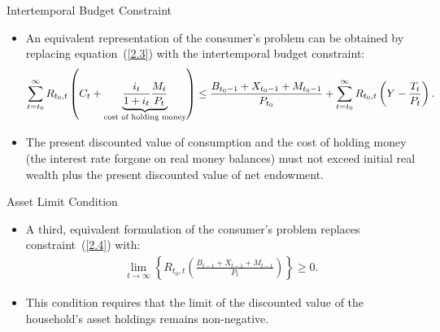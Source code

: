 \documentclass[11pt,aspectratio=169]{beamer}
\begin{document}
\begin{frame}{Intertemporal Budget Constraint}

\begin{itemize}
    \item An equivalent representation of the consumer’s problem can be obtained by replacing equation~(\ref{2.3}) with the intertemporal budget constraint:
\begin{align}
\sum_{t=t_0}^\infty R_{t_0,t}\left(
    C_t
    + 
    \underbrace{\frac{i_t}{1+i_t}\frac{M_t}{P_t}}_{\footnotesize\text{cost of holding money}}
\right)
\le 
\frac{B_{t_0-1}+X_{t_0-1}+M_{t_0-1}}{P_{t_0}}
+ 
\sum_{t=t_0}^\infty R_{t_0,t}\left(
    Y-\frac{T_t}{P_t}
\right).
\label{2.4}
\end{align}

\item The present discounted value of consumption and the cost of holding money (the interest rate forgone on real money balances) must not exceed initial real wealth plus the present discounted value of net endowment.
\end{itemize}
\end{frame}
\begin{frame}{Asset Limit Condition}

\begin{itemize}
    \item A third, equivalent formulation of the consumer’s problem replaces constraint~(\ref{2.4}) with:
    \begin{align}
    \lim_{t \to \infty} 
    \left\{ 
    R_{t_0,t} 
    \left( 
    \frac{B_{t-1} + X_{t-1} + M_{t-1}}{P_t}
    \right) 
    \right\} 
    \ge 0.
   \label{2.5}
    \end{align}
\vspace{0.5em}
    \item This condition requires that the limit of the discounted value of the household’s asset holdings remains non-negative.
\end{itemize}

\end{frame}
\end{document}
